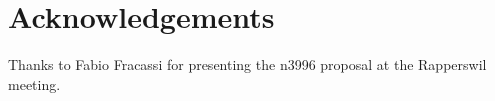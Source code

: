\section{Acknowledgements}

Thanks to Fabio Fracassi for presenting the n3996 proposal at the Rapperswil meeting.
